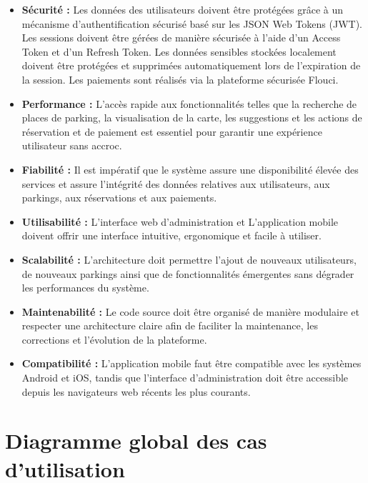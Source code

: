 \begin{itemize}

\item \textbf{Sécurité :} Les données des utilisateurs doivent être protégées grâce à un mécanisme d'authentification sécurisé basé sur les JSON Web Tokens (JWT). Les sessions doivent être gérées de manière sécurisée à l'aide d'un Access Token et d'un Refresh Token. Les données sensibles stockées localement doivent être protégées et supprimées automatiquement lors de l'expiration de la session. Les paiements sont réalisés via la plateforme sécurisée Flouci.

\item \textbf{Performance :} L'accès rapide aux fonctionnalités telles que la recherche de places de parking, la visualisation de la carte, les suggestions et les actions de réservation et de paiement est essentiel pour garantir une expérience utilisateur sans accroc.

\item \textbf{Fiabilité :} Il est impératif que le système assure une disponibilité élevée des services et assure l'intégrité des données relatives aux utilisateurs, aux parkings, aux réservations et aux paiements.

\item \textbf{Utilisabilité :} L'interface web d'administration et L'application mobile doivent offrir une interface intuitive, ergonomique et facile à utiliser.

\item \textbf{Scalabilité :} L'architecture doit permettre l'ajout de nouveaux utilisateurs, de nouveaux parkings ainsi que de fonctionnalités émergentes sans dégrader les performances du système.

\item \textbf{Maintenabilité :} Le code source doit être organisé de manière modulaire et respecter une architecture claire afin de faciliter la maintenance, les corrections et l'évolution de la plateforme.

\item \textbf{Compatibilité :} L'application mobile faut être compatible avec les systèmes Android et iOS, tandis que l'interface d'administration doit être accessible depuis les navigateurs web récents les plus courants.

\end{itemize}
\section{Diagramme global des cas d'utilisation}

